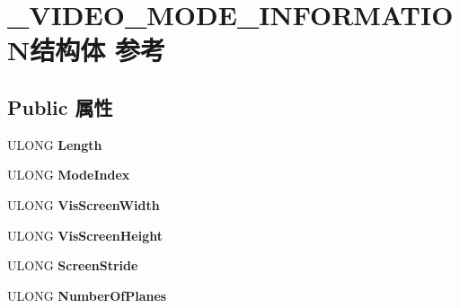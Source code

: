 \hypertarget{struct___v_i_d_e_o___m_o_d_e___i_n_f_o_r_m_a_t_i_o_n}{}\section{\+\_\+\+V\+I\+D\+E\+O\+\_\+\+M\+O\+D\+E\+\_\+\+I\+N\+F\+O\+R\+M\+A\+T\+I\+O\+N结构体 参考}
\label{struct___v_i_d_e_o___m_o_d_e___i_n_f_o_r_m_a_t_i_o_n}
\subsection*{Public 属性}
\begin{DoxyCompactItemize}
\item 
\mbox{\label{struct___v_i_d_e_o___m_o_d_e___i_n_f_o_r_m_a_t_i_o_n_a629f71924ca009e14cefc070320a3757}} 
U\+L\+O\+NG {\bfseries Length}
\item 
\mbox{\label{struct___v_i_d_e_o___m_o_d_e___i_n_f_o_r_m_a_t_i_o_n_a684db37370c33fe519e10e7bb28388d3}} 
U\+L\+O\+NG {\bfseries Mode\+Index}
\item 
\mbox{\label{struct___v_i_d_e_o___m_o_d_e___i_n_f_o_r_m_a_t_i_o_n_a8e8ff5159cb4a04f7062ce232167b666}} 
U\+L\+O\+NG {\bfseries Vis\+Screen\+Width}
\item 
\mbox{\label{struct___v_i_d_e_o___m_o_d_e___i_n_f_o_r_m_a_t_i_o_n_a77b277e10f31df377ef78c147e6ff87f}} 
U\+L\+O\+NG {\bfseries Vis\+Screen\+Height}
\item 
\mbox{\label{struct___v_i_d_e_o___m_o_d_e___i_n_f_o_r_m_a_t_i_o_n_ad650fc7e67e6f8fbbe0af2d2c37b0dd4}} 
U\+L\+O\+NG {\bfseries Screen\+Stride}
\item 
\mbox{\label{struct___v_i_d_e_o___m_o_d_e___i_n_f_o_r_m_a_t_i_o_n_aaaa290a229547ce357593ebfe29a7fd1}} 
U\+L\+O\+NG {\bfseries Number\+Of\+Planes}
\item 
\mbox{\label{struct___v_i_d_e_o___m_o_d_e___i_n_f_o_r_m_a_t_i_o_n_a0f17bcdcb2a3c7702676065f107a2d9c}} 

\end{DoxyCompactItemize}
